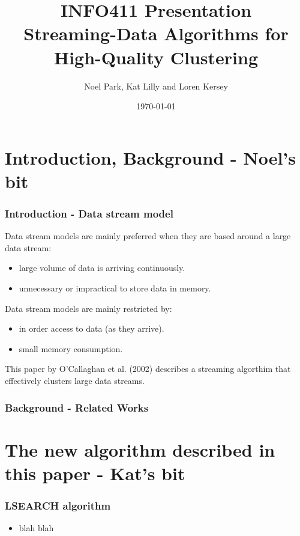 \documentclass{beamer}
\title{INFO411 Presentation \\ Streaming-Data Algorithms for High-Quality Clustering}
\author{Noel Park, Kat Lilly and Loren Kersey}
\date{\today}
\begin{document}
\frame{\titlepage}

\section[Outline]{}
\frame{\tableofcontents}

\section{Introduction, Background - Noel's bit}

\frame
{
  \frametitle{Introduction - Data stream model}
  
  Data stream models are mainly preferred when they are based around a large data stream:

  \begin{itemize}
    \item large volume of data is arriving continuously.
    \item unnecessary or impractical to store data in memory.
    \newline
  \end{itemize}

  Data stream models are mainly restricted by:
  \begin{itemize}
    \item in order access to data (as they arrive).
    \item small memory consumption.
    \newline
  \end{itemize}

  This paper by O'Callaghan et al. (2002) describes a streaming algorthim that effectively clusters large data streams.

}

\frame
{
  \frametitle{Background - Related Works}
  

}

\section{The new algorithm described in this paper - Kat's bit}
\frame
{
  \frametitle{LSEARCH algorithm}

  \begin{itemize}
  \item  blah blah
  \end{itemize}
}
\end{document}
